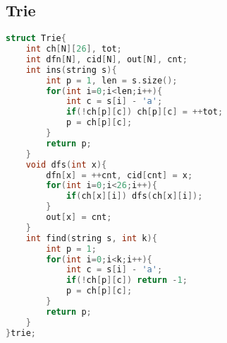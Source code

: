 \subsection{Trie}
\begin{lstlisting}[language=c++]
struct Trie{
    int ch[N][26], tot;
    int dfn[N], cid[N], out[N], cnt;
    int ins(string s){
        int p = 1, len = s.size();
        for(int i=0;i<len;i++){
            int c = s[i] - 'a';
            if(!ch[p][c]) ch[p][c] = ++tot;
            p = ch[p][c];
        }
        return p;
    }
    void dfs(int x){
        dfn[x] = ++cnt, cid[cnt] = x;
        for(int i=0;i<26;i++){
            if(ch[x][i]) dfs(ch[x][i]);
        }
        out[x] = cnt;
    }
    int find(string s, int k){
        int p = 1;
        for(int i=0;i<k;i++){
            int c = s[i] - 'a';
            if(!ch[p][c]) return -1;
            p = ch[p][c];
        }
        return p;
    }
}trie;
\end{lstlisting}